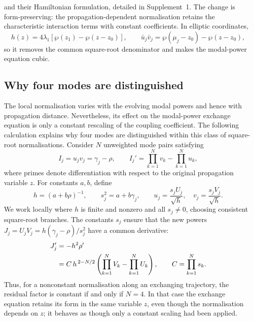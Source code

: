 \documentclass{optica-article}
\numberwithin{equation}{section}
\begin{document}
and their Hamiltonian formulation, detailed in Supplement~1.
The change is form-preserving: the propagation-dependent normalisation retains the characteristic interaction terms with constant coefficients.
In elliptic coordinates,
\begin{equation}
h(z)=4\lambda_1[\wp(z_1)-\wp(z-z_0)],\qquad
\bar u_j\bar v_j=\wp(\mu_j-z_0)-\wp(z-z_0),
\label{eq:dwp-h-bar}
\end{equation}
so it removes the common square-root denominator and makes the modal-power equation cubic.

\subsection{Why four modes are distinguished}\label{subsec:four-mode-invariance}

The local normalisation varies with the evolving modal powers and hence with propagation distance.
Nevertheless, its effect on the modal-power exchange equation is only a constant rescaling of the coupling coefficient.
The following calculation explains why four modes are distinguished within this class of square-root normalisations.
Consider $N$ unweighted mode pairs satisfying
\begin{equation}
I_j=u_jv_j=\gamma_j-\rho,\qquad
I_j'=\prod_{k=1}^{N}v_k-\prod_{k=1}^{N}u_k,
\label{eq:N-mode-power-exchange}
\end{equation}
where primes denote differentiation with respect to the original propagation variable $z$.
For constants $a,b$, define
\begin{equation}
h=(a+b\rho)^{-1},\qquad s_j^2=a+b\gamma_j,\qquad
u_j=\frac{s_jU_j}{\sqrt h},\quad
v_j=\frac{s_jV_j}{\sqrt h}.
\label{eq:N-mode-local-normalisation}
\end{equation}
We work locally where $h$ is finite and nonzero and all $s_j\ne0$, choosing consistent square-root branches.
The constants $s_j$ ensure that the new powers $J_j=U_jV_j=h(\gamma_j-\rho)/s_j^2$ have a common derivative:
\begin{align}
J_j'&=-h^2\rho' \notag\\
&=C\,h^{\,2-N/2}
\left(\prod_{k=1}^{N}V_k-\prod_{k=1}^{N}U_k\right),
\qquad C=\prod_{k=1}^{N}s_k.
\label{eq:N-mode-normalised-exchange}
\end{align}
Thus, for a nonconstant normalisation along an exchanging trajectory, the residual factor is constant if and only if $N=4$.
In that case the exchange equation retains its form in the same variable $z$, even though the normalisation depends on $z$; it behaves as though only a constant scaling had been applied.
\end{document}
